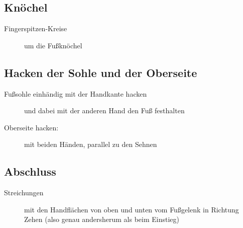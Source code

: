 \subsection{Knöchel}
\begin{description}
  \item[Fingerspitzen-Kreise] um die Fußknöchel
\end{description}

\subsection{Hacken der Sohle und der Oberseite}
\begin{description}
  \item[Fußsohle einhändig mit der Handkante hacken] und dabei mit der anderen Hand den Fuß festhalten
  \item[Oberseite hacken:] mit beiden Händen, parallel zu den Sehnen
\end{description}

\subsection{Abschluss}
\begin{description}
  \item[Streichungen] mit den Handflächen von oben und unten vom Fußgelenk in Richtung Zehen (also genau andersherum als beim Einstieg)
\end{description}
